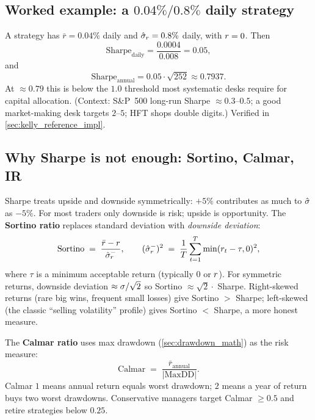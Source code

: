 \subsection{Worked example: a $0.04\% / 0.8\%$ daily strategy}

A strategy has $\bar r = 0.04\%$ daily and $\hat{\sigma}_r = 0.8\%$
daily, with $r = 0$. Then
\begin{equation}
  \text{Sharpe}_{\text{daily}}
  = \frac{0.0004}{0.008} = 0.05,
\end{equation}
and
\begin{equation}
  \text{Sharpe}_{\text{annual}}
  = 0.05 \cdot \sqrt{252}
  \approx 0.7937.
\end{equation}
At $\approx 0.79$ this is below the $1.0$ threshold most
systematic desks require for capital allocation. (Context:
S\&P~500 long-run Sharpe $\approx 0.3$--$0.5$; a good
market-making desk targets $2$--$5$; HFT shops double digits.)
Verified in \cref{sec:kelly_reference_impl}.

\subsection{Why Sharpe is not enough: Sortino, Calmar, IR}

Sharpe treats upside and downside symmetrically: $+5\%$
contributes as much to $\hat{\sigma}$ as $-5\%$. For most traders
only downside is risk; upside is opportunity. The \textbf{Sortino
ratio} replaces standard deviation with \emph{downside deviation}:
\begin{equation}
  \text{Sortino}
  \;=\;
  \frac{\bar r - r}{\hat{\sigma}^{-}_r},
  \qquad
  (\hat{\sigma}^{-}_r)^2
  \;=\; \frac{1}{T}\sum_{t=1}^T \min(r_t - \tau, 0)^2,
\end{equation}
where $\tau$ is a minimum acceptable return (typically $0$ or
$r$). For symmetric returns, downside deviation $\approx
\sigma/\sqrt{2}$ so Sortino $\approx \sqrt{2} \cdot$ Sharpe.
Right-skewed returns (rare big wins, frequent small losses) give
Sortino $>$ Sharpe; left-skewed (the classic ``selling
volatility'' profile) gives Sortino $<$ Sharpe, a more honest
measure.

The \textbf{Calmar ratio} uses max drawdown
(\cref{sec:drawdown_math}) as the risk measure:
\begin{equation}
  \text{Calmar}
  \;=\; \frac{\bar r_{\text{annual}}}{|\text{MaxDD}|}.
\end{equation}
Calmar $1$ means annual return equals worst drawdown; $2$ means a
year of return buys two worst drawdowns. Conservative managers
target Calmar $\geq 0.5$ and retire strategies below $0.25$.

